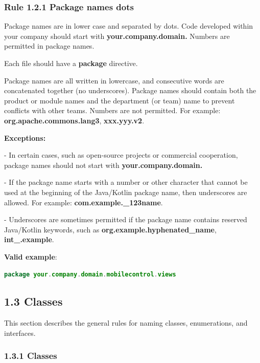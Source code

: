 {{{{\subsubsection*{\textbf{Rule 1.2.1 Package names dots}}
\leavevmode\newline


Package names are in lower case and separated by dots. Code developed within your company should start with \textbf{your.company.domain.} Numbers are permitted in package names.

Each file should have a \textbf{package} directive.

Package names are all written in lowercase, and consecutive words are concatenated together (no underscores). Package names should contain both the product or module names and the department (or team) name to prevent conflicts with other teams.  Numbers are not permitted. For example: \textbf{org.apache.commons.lang3}, \textbf{xxx.yyy.v2}.



\textbf{Exceptions:} 



- In certain cases, such as open-source projects or commercial cooperation, package names should not start with \textbf{your.company.domain.}

- If the package name starts with a number or other character that cannot be used at the beginning of the Java/Kotlin package name, then underscores are allowed. For example: \textbf{com.example._123name}.

- Underscores are sometimes permitted if the package name contains reserved Java/Kotlin keywords, such as \textbf{org.example.hyphenated_name}, \textbf{int_.example}.



\textbf{Valid example}: 

\begin{lstlisting}[language=Kotlin]
package your.company.domain.mobilecontrol.views
\end{lstlisting}


\subsection*{\textbf{1.3 Classes}}

\label{sec:1.3}

This section describes the general rules for naming classes, enumerations, and interfaces.

\subsubsection*{\textbf{1.3.1 Classes}}
\leavevmode\newline

}}}}
